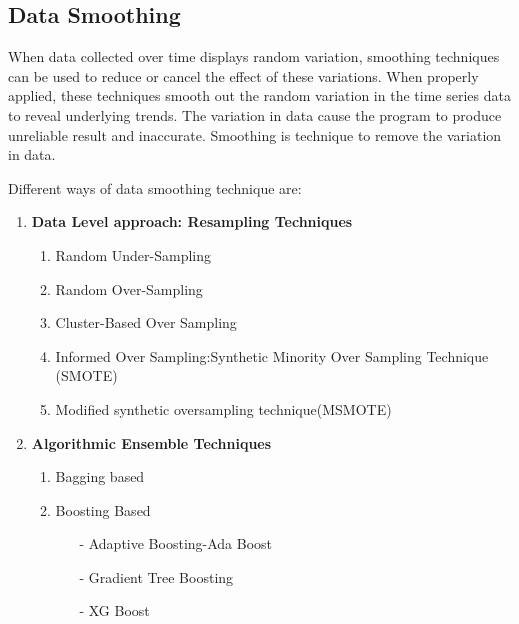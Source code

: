 \subsection{Data Smoothing}
When data collected over time displays random variation, smoothing techniques can be used to reduce or cancel the effect of these variations. When properly applied, these techniques smooth out the random variation in the time series data to reveal underlying trends. The variation  in data cause the program to  produce unreliable result and inaccurate. Smoothing is technique to remove the variation in data. 
\par
Different ways of data smoothing technique are:
\begin{enumerate}
\item \textbf{Data Level approach: Resampling Techniques}
	\begin{enumerate}
	\item Random Under-Sampling
	\item Random Over-Sampling
	\item Cluster-Based Over Sampling
	\item Informed Over Sampling:Synthetic Minority Over Sampling Technique (SMOTE)
	\item Modified synthetic oversampling technique(MSMOTE)
	\end{enumerate}

\item \textbf{Algorithmic Ensemble Techniques}
	\begin{enumerate}
	\item Bagging based
	\item Boosting Based
		\begin{itemize}
		\item[-] Adaptive Boosting-Ada Boost
		\item[-] Gradient Tree Boosting
		\item[-] XG Boost
		\end{itemize}
	\end{enumerate}

\end{enumerate}
